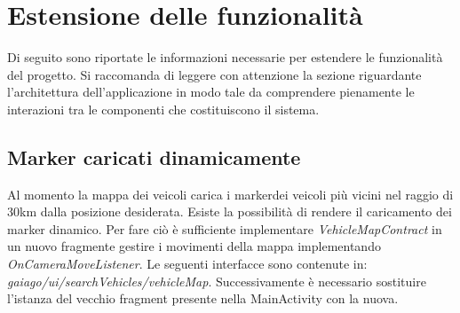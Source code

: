 \section{Estensione delle funzionalità}
Di seguito sono riportate le informazioni necessarie per estendere le funzionalità del progetto. Si raccomanda di leggere con attenzione la sezione riguardante l'architettura dell'applicazione in modo tale da comprendere pienamente le interazioni tra le componenti che costituiscono il sistema.
\subsection{Marker caricati dinamicamente}
Al momento la mappa dei veicoli carica i marker\glosp dei veicoli più vicini nel raggio di 30km dalla posizione desiderata. Esiste la possibilità di rendere il caricamento dei marker dinamico. Per fare ciò è sufficiente implementare \textit{VehicleMapContract} in un nuovo fragment\glosp e gestire i movimenti della mappa implementando \textit{OnCameraMoveListener}.
Le seguenti interfacce sono contenute in:
\textit{gaiago/ui/searchVehicles/vehicleMap}.
Successivamente è necessario sostituire l'istanza del vecchio fragment presente nella MainActivity con la nuova.